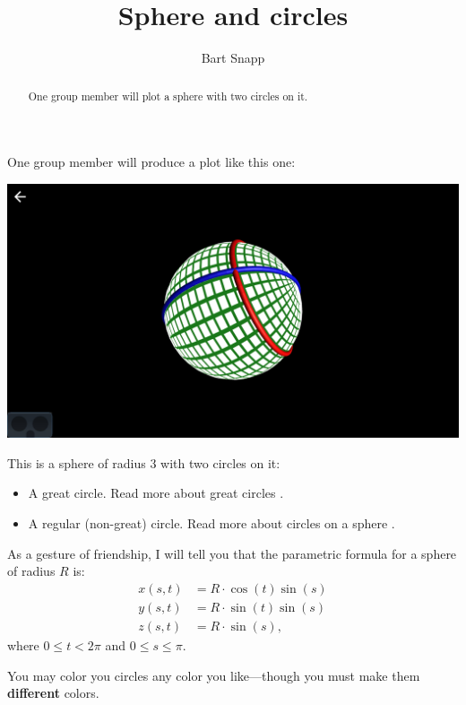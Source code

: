 \documentclass{ximera}
\author{Bart Snapp}
\title{Sphere and circles}
\begin{document}
\begin{abstract}
  One group member will plot a sphere with two circles on it.
\end{abstract}
\maketitle

One group member will produce a plot like this one:
\begin{image}
  \includegraphics{sphereAndCircles.png}
\end{image}

This is a sphere of radius $3$ with two circles on it:
\begin{itemize}
\item A great circle. Read more about great circles .
\item A regular (non-great) circle. Read more about circles on a sphere .
\end{itemize}

As a gesture of friendship, I will tell you that the parametric
formula for a sphere of radius $R$ is:
\begin{align*}
  x(s,t) &= R\cdot \cos(t)\sin(s)\\
  y(s,t) &= R\cdot \sin(t)\sin(s)\\
  z(s,t) &= R\cdot \sin(s),
\end{align*}
where $0\le t< 2\pi$ and $0\le s \le \pi$.

You may color you circles any color you like---though you must make
them \textbf{different} colors.
\end{document}
